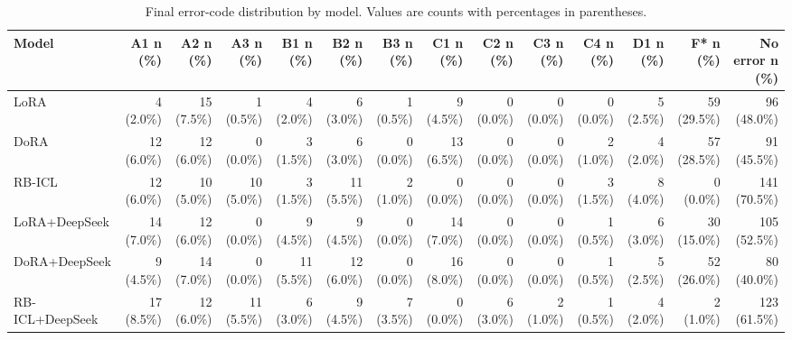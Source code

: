 \begin{table}[htbp]
\centering
\small
\begin{tabular}{lrrrrrrrrrrrrr}
\toprule
Model & A1 n (\%) & A2 n (\%) & A3 n (\%) & B1 n (\%) & B2 n (\%) & B3 n (\%) & C1 n (\%) & C2 n (\%) & C3 n (\%) & C4 n (\%) & D1 n (\%) & F* n (\%) & No error n (\%) \\
\midrule
LoRA & 4 (2.0\%) & 15 (7.5\%) & 1 (0.5\%) & 4 (2.0\%) & 6 (3.0\%) & 1 (0.5\%) & 9 (4.5\%) & 0 (0.0\%) & 0 (0.0\%) & 0 (0.0\%) & 5 (2.5\%) & 59 (29.5\%) & 96 (48.0\%) \\
DoRA & 12 (6.0\%) & 12 (6.0\%) & 0 (0.0\%) & 3 (1.5\%) & 6 (3.0\%) & 0 (0.0\%) & 13 (6.5\%) & 0 (0.0\%) & 0 (0.0\%) & 2 (1.0\%) & 4 (2.0\%) & 57 (28.5\%) & 91 (45.5\%) \\
RB-ICL & 12 (6.0\%) & 10 (5.0\%) & 10 (5.0\%) & 3 (1.5\%) & 11 (5.5\%) & 2 (1.0\%) & 0 (0.0\%) & 0 (0.0\%) & 0 (0.0\%) & 3 (1.5\%) & 8 (4.0\%) & 0 (0.0\%) & 141 (70.5\%) \\
LoRA+DeepSeek & 14 (7.0\%) & 12 (6.0\%) & 0 (0.0\%) & 9 (4.5\%) & 9 (4.5\%) & 0 (0.0\%) & 14 (7.0\%) & 0 (0.0\%) & 0 (0.0\%) & 1 (0.5\%) & 6 (3.0\%) & 30 (15.0\%) & 105 (52.5\%) \\
DoRA+DeepSeek & 9 (4.5\%) & 14 (7.0\%) & 0 (0.0\%) & 11 (5.5\%) & 12 (6.0\%) & 0 (0.0\%) & 16 (8.0\%) & 0 (0.0\%) & 0 (0.0\%) & 1 (0.5\%) & 5 (2.5\%) & 52 (26.0\%) & 80 (40.0\%) \\
RB-ICL+DeepSeek & 17 (8.5\%) & 12 (6.0\%) & 11 (5.5\%) & 6 (3.0\%) & 9 (4.5\%) & 7 (3.5\%) & 0 (0.0\%) & 6 (3.0\%) & 2 (1.0\%) & 1 (0.5\%) & 4 (2.0\%) & 2 (1.0\%) & 123 (61.5\%) \\
\bottomrule
\end{tabular}
\caption{Final error-code distribution by model. Values are counts with percentages in parentheses.}
\label{tab:overall_error_distribution}
\end{table}
